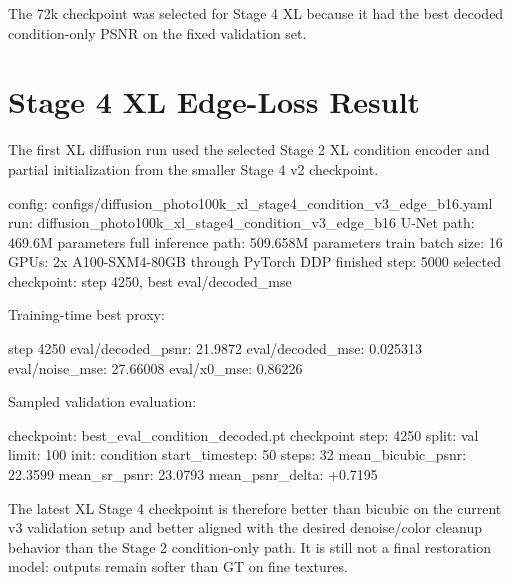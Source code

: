 \documentclass[
  10pt,
]{article}
\newenvironment{Shaded}{}{}
\newcommand{\NormalTok}[1]{#1}
\begin{document}
The 72k checkpoint was selected for Stage 4 XL because it had the best
decoded condition-only PSNR on the fixed validation set.

\hypertarget{stage-4-xl-edge-loss-result}{%
\section{Stage 4 XL Edge-Loss
Result}\label{stage-4-xl-edge-loss-result}}

The first XL diffusion run used the selected Stage 2 XL condition
encoder and partial initialization from the smaller Stage 4 v2
checkpoint.

\begin{Shaded}
\begin{Highlighting}[]
\NormalTok{config: configs/diffusion\_photo100k\_xl\_stage4\_condition\_v3\_edge\_b16.yaml}
\NormalTok{run: diffusion\_photo100k\_xl\_stage4\_condition\_v3\_edge\_b16}
\NormalTok{U{-}Net path: 469.6M parameters}
\NormalTok{full inference path: 509.658M parameters}
\NormalTok{train batch size: 16}
\NormalTok{GPUs: 2x A100{-}SXM4{-}80GB through PyTorch DDP}
\NormalTok{finished step: 5000}
\NormalTok{selected checkpoint: step 4250, best eval/decoded\_mse}
\end{Highlighting}
\end{Shaded}

Training-time best proxy:

\begin{Shaded}
\begin{Highlighting}[]
\NormalTok{step 4250}
\NormalTok{eval/decoded\_psnr: 21.9872}
\NormalTok{eval/decoded\_mse: 0.025313}
\NormalTok{eval/noise\_mse: 27.66008}
\NormalTok{eval/x0\_mse: 0.86226}
\end{Highlighting}
\end{Shaded}

Sampled validation evaluation:

\begin{Shaded}
\begin{Highlighting}[]
\NormalTok{checkpoint: best\_eval\_condition\_decoded.pt}
\NormalTok{checkpoint step: 4250}
\NormalTok{split: val}
\NormalTok{limit: 100}
\NormalTok{init: condition}
\NormalTok{start\_timestep: 50}
\NormalTok{steps: 32}
\NormalTok{mean\_bicubic\_psnr: 22.3599}
\NormalTok{mean\_sr\_psnr: 23.0793}
\NormalTok{mean\_psnr\_delta: +0.7195}
\end{Highlighting}
\end{Shaded}

The latest XL Stage 4 checkpoint is therefore better than bicubic on the
current v3 validation setup and better aligned with the desired
denoise/color cleanup behavior than the Stage 2 condition-only path. It
is still not a final restoration model: outputs remain softer than GT on
fine textures.
\end{document}
